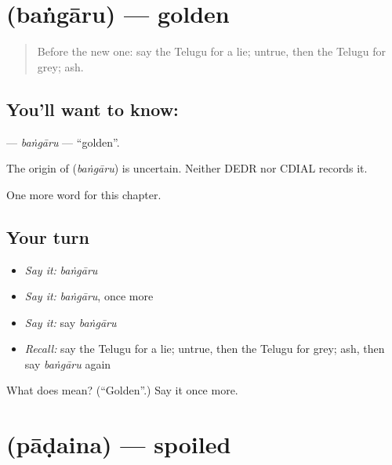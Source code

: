 \section[\texorpdfstring{\te{బంగారు} (baṅgāru)}{బంగారు (baṅgāru)}]{ (baṅgāru) — golden}

\label{lesson:TE-C140-bangaru}



\begin{quote}
Before the new one: say the Telugu for a lie; untrue, then the Telugu for grey; ash.
\end{quote}

\subsection*{You'll want to know: }
\textbf{} — \emph{baṅgāru} — \textquotedblleft{}golden\textquotedblright{}.

\begin{cousinweb}
The origin of \textbf{} (\emph{baṅgāru}) is uncertain. Neither DEDR nor CDIAL records it.
\end{cousinweb}

\begin{grammarlens}[title={What you've built}]
One more word for this chapter.
\end{grammarlens}

\subsection*{Your turn}
\begin{itemize}
\raggedright
  \item \emph{Say it:} \emph{baṅgāru}
  \item \emph{Say it:} \emph{baṅgāru}, once more
  \item \emph{Say it:} say \emph{baṅgāru}
  \item \emph{Recall:} say the Telugu for a lie; untrue, then the Telugu for grey; ash, then say \emph{baṅgāru} again
\end{itemize}

\begin{tcolorbox}[breakable,colback=teal!4,colframe=teal!35!black,title={Before you move on}]
What does  mean? (\textquotedblleft{}Golden\textquotedblright{}.) Say it once more.
\end{tcolorbox}
\section[\texorpdfstring{\te{పాడైన} (pāḍaina)}{పాడైన (pāḍaina)}]{ (pāḍaina) — spoiled}

